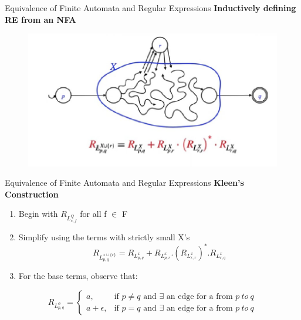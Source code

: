 \documentclass{beamer}
\begin{document}
\begin{frame}{Equivalence of Finite Automata and Regular Expressions}
\textbf{Inductively defining RE from an NFA}
	\begin{figure}
	\includegraphics[scale=.5]{img2/m25}
\end{figure}
\end{frame}
\begin{frame}{Equivalence of Finite Automata and Regular Expressions}
\textbf{Kleen's Construction}
\begin{enumerate}
	\item Begin with $R_{L_{s,f}^Q}$ for all f $\in$ F
    \item Simplify using the terms with strictly small X's
	   $$R_{L_{p,q}^{x \cup \{r\}}}=R_{L_{p,q}^x }+R_{L_{p,r}^x }.(R_{L_{r,r}^x })^*.R_{L_{r,q}^x }$$
	   \item For the base terms, observe that:
\end{enumerate}
 \begin{equation*}
	R_{L_{p,q}^\phi }=\begin{cases}
		a, & \text{if $p\neq q$ and $\exists$ an edge for a from $p\  to\  q$}\\
		a+\epsilon, & \text{if $p=q$ and $\exists$ an edge for a from $p\  to\  q$}
	\end{cases}
\end{equation*}
 \end{frame}
\end{document}
